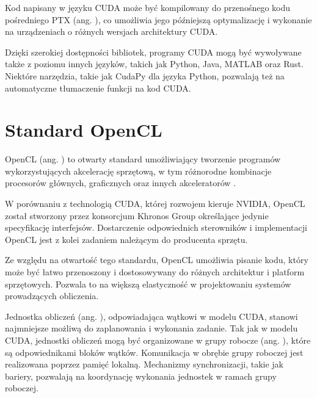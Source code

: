 Kod napisany w języku CUDA może być kompilowany do przenośnego kodu pośredniego PTX
(ang. ), co umożliwia jego późniejszą optymalizację i wykonanie
na urządzeniach o różnych wersjach architektury CUDA.

Dzięki szerokiej dostępności bibliotek, programy CUDA mogą być wywoływane także z poziomu
innych języków, takich jak Python, Java, MATLAB oraz Rust. Niektóre narzędzia, takie jak CudaPy
dla języka Python, pozwalają też na automatyczne tłumaczenie funkcji na kod CUDA.

\section{Standard OpenCL}

OpenCL (ang. ) to otwarty standard umożliwiający tworzenie programów
wykorzystujących akcelerację sprzętową, w tym różnorodne kombinacje procesorów głównych, graficznych oraz
innych akceleratorów \cite{opencl}.

W porównaniu z technologią CUDA, której rozwojem kieruje NVIDIA, OpenCL został stworzony przez konsorcjum
Khronos Group określające jedynie specyfikację interfejsów. Dostarczenie odpowiednich sterowników i
implementacji OpenCL jest z kolei zadaniem należącym do producenta sprzętu.

Ze względu na otwartość tego standardu, OpenCL umożliwia pisanie kodu, który może być łatwo przenoszony i
dostosowywany do różnych architektur i platform sprzętowych. Pozwala to na większą elastyczność w projektowaniu
systemów prowadzących obliczenia.

Jednostka obliczeń (ang. ), odpowiadająca wątkowi w modelu CUDA, stanowi najmniejsze
możliwą do zaplanowania i wykonania zadanie. Tak jak w modelu CUDA, jednostki obliczeń mogą być organizowane
w grupy robocze (ang. ), które są odpowiednikami bloków wątków. Komunikacja w obrębie
grupy roboczej jest realizowana poprzez pamięć lokalną. Mechanizmy synchronizacji, takie jak bariery, pozwalają
na koordynację wykonania jednostek w ramach grupy roboczej.

